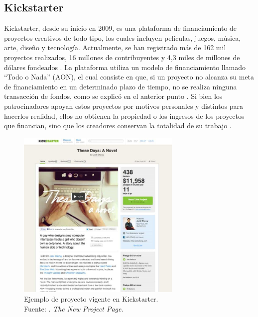 \subsection{Kickstarter}
Kickstarter, desde su inicio en 2009, es una plataforma de financiamiento de proyectos creativos de todo tipo, los cuales incluyen películas, juegos, música, arte, diseño y tecnología. Actualmente, se han registrado más de 162 mil proyectos realizados, 16 millones de contribuyentes y 4,3 miles de millones de dólares fondeados \parencite{cr_kickstarter_about}. La plataforma utiliza un modelo de financiamiento llamado “Todo o Nada” (AON), el cual consiste en que, si un proyecto no alcanza su meta de financiamiento en un determinado plazo de tiempo, no se realiza ninguna transacción de fondos, como se explicó en el anterior punto \parencite{cr_kickstarter_founding}. Si bien los patrocinadores apoyan estos proyectos por motivos personales y distintos para hacerlos realidad, ellos no obtienen la propiedad o los ingresos de los proyectos que financian, sino que los creadores conservan la totalidad de su trabajo \parencite{cr_kickstarter_press}.

\begin{figure}[!ht]
	\begin{center}
		\includegraphics[width=0.70\textwidth]{2/figures/kickstarter_project.jpg}
		\caption[Ejemplo de proyecto vigente en Kickstarter]{Ejemplo de proyecto vigente en Kickstarter.\\
			Fuente: \cite{cr_perry2012kickstarterproject}. \textit{The New Project Page}.}
		\label{2:fig52}
	\end{center}
\end{figure}

